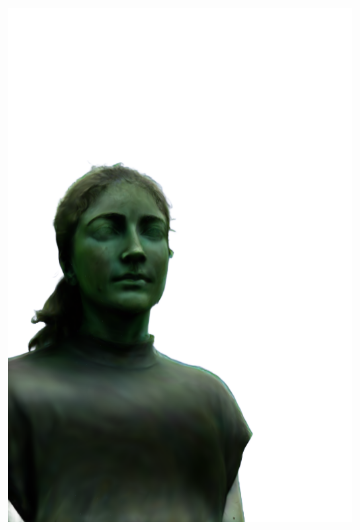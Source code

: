 \begin{figure}[ht]
\begin{subfigure}{0.08\linewidth}
        \includegraphics[width=\textwidth]{Figures/results/high/irene_stone/11_render.png}

\end{subfigure}
\end{figure}
